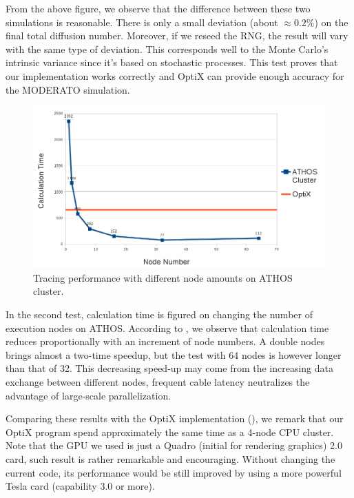 From the above figure, we observe that the difference between these two simulations is reasonable. There is only a small deviation (about $\approx 0.2 \%$) on the final total diffusion number. Moreover, if we reseed the RNG, the result will vary with the same type of deviation. This corresponds well to the Monte Carlo's intrinsic variance since it's based on stochastic processes. This test proves that our implementation works correctly and OptiX can provide enough accuracy for the MODERATO simulation.

\begin{figure}[htbp]
	\centering
		\includegraphics[width=\textwidth]{Figures/cluster.png}
	\caption{Tracing performance with different node amounts on ATHOS cluster.}
	\label{fig:cluster}
\end{figure}

In the second test, calculation time is figured on changing the number of execution nodes on ATHOS. According to , we observe that calculation time reduces proportionally with an increment of node numbers. A double nodes brings almost a two-time speedup, but the test with 64 nodes is however longer than that of 32. This decreasing speed-up may come from the increasing data exchange between different nodes, frequent cable latency neutralizes the advantage of large-scale parallelization.

Comparing these results with the OptiX implementation (), we remark that our OptiX program spend approximately the same time as a 4-node CPU cluster. Note that the GPU we used is just a Quadro (initial for rendering graphics) 2.0 card, such result is rather remarkable and encouraging. Without changing the current code, its performance would be still improved by using a more powerful Tesla card (capability 3.0 or more).

